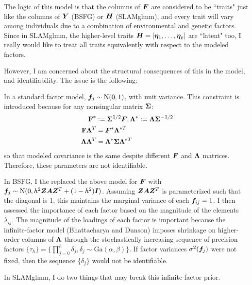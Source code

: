 \documentclass[11pt]{amsart}
\newcommand*{\B}[1]{\ifmmode\bm{#1}\else\textbf{#1}\fi}
\begin{document}
The logic of this model is that the columns of $\B{F}$ are considered to be ``traits" just like the columns of $\B{Y}$ (BSFG) or $\B{H}$ (SLAMglmm), and every trait will vary among individuals due to a combination of environmental and genetic factors. Since in SLAMglmm, the higher-level traits $\B{H} = [\B{\eta}_1,\dots,\B{\eta}_p]$ are ``latent" too, I really would like to treat all traits equivalently with respect to the modeled factors. 

However, I am concerned about the structural consequences of this in the model, and identifiability. The issue is the following:

In a standard factor model, $\B{f}_j \sim \mbox{N}(0,1)$, with unit variance. This constraint is introduced because for any nonsingular matrix $\B{\Sigma}$:
\begin{align*}
\B{F}^* &:= \B{\Sigma}^{1/2}\B{F}, \B{\Lambda}^* := \B{\Lambda} \B{\Sigma}^{-1/2} \\
\B{F}\B{\Lambda}^T &= \B{F}^*\B{\Lambda}^{*T} \\ 
\;\B{\Lambda}\B{\Lambda}^T &= \B{\Lambda}^* \B{\Sigma} \B{\Lambda}^{*T}
\end{align*} 
\noindent so that modeled covariance is the same despite different $\B{F}$ and $\B{\Lambda}$ matrices. Therefore, these parameters are not identifiable.

In BSFG, I the replaced the above model for $\B{F}$ with $\B{f}_j \sim \mbox{N}(0,h^2\B{ZAZ}^T + (1-h^2)\B{I})$. Assuming $\B{ZAZ}^T$ is parameterized such that the diagonal is 1, this maintains the marginal variance of each $\B{f}_{ij} = 1$. I then assessed the importance of each factor based on the magnitude of the elements $\lambda_{ij}$. The magnitude of the loadings of each factor is important because the infinite-factor model (Bhattacharya and Dunson) imposes shrinkage on higher-order columns of $\B{\Lambda}$ through the stochastically increasing sequence of precision factors $\{\tau_h\} = \Big\{\prod\limits_{j=0}^{h} \delta_j, \delta_j \sim \mbox{Ga}(\alpha,\beta)\Big\}$. If factor variances $\sigma^2(\B{f}_j)$ were not fixed, then the sequence $\{\delta_j\}$  would not be identifiable.

In SLAMglmm, I do two things that may break this infinite-factor prior. 
\end{document}

